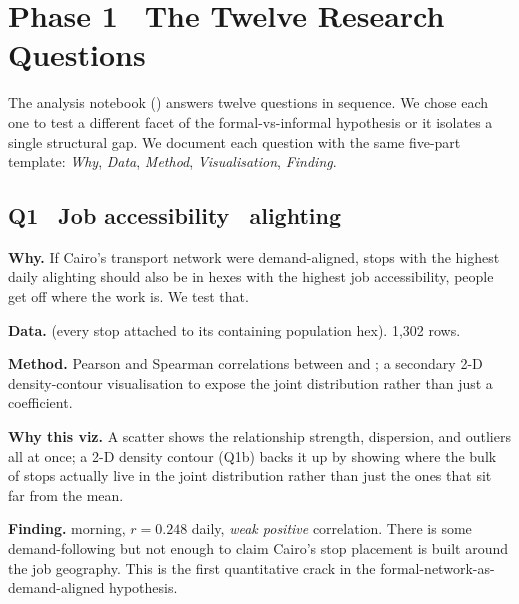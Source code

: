 
\section{Phase 1 \textbullet\ The Twelve Research Questions}
\label{sec:phase1-questions}

The analysis notebook () answers twelve
questions in sequence. We chose each one to test a different
facet of the formal-vs-informal hypothesis or it isolates a single
structural gap. We document each question with the same five-part
template: \emph{Why}, \emph{Data}, \emph{Method}, \emph{Visualisation},
\emph{Finding}.

\subsection{Q1 \textbullet\ Job accessibility \texttimes\ alighting}

\textbf{Why.} If Cairo's transport network were demand-aligned, stops
with the highest daily alighting should also be in hexes with the
highest job accessibility, people get off where the work is. We test
that.

\textbf{Data.}  (every stop
attached to its containing population hex). 1{,}302 rows.

\textbf{Method.} Pearson and Spearman correlations between
 and ; a
secondary 2-D density-contour visualisation to expose the joint
distribution rather than just a coefficient.


\textbf{Why this viz.} A scatter shows the relationship strength,
dispersion, and outliers all at once; a 2-D density contour
(Q1b) backs it up by showing where the bulk of stops actually live in
the joint distribution rather than just the ones that sit far from
the mean.

\textbf{Finding.}  morning, $r = 0.248$ daily,
\emph{weak positive} correlation. There is some demand-following but
not enough to claim Cairo's stop placement is built around the job
geography. This is the first quantitative crack in the
formal-network-as-demand-aligned hypothesis.

